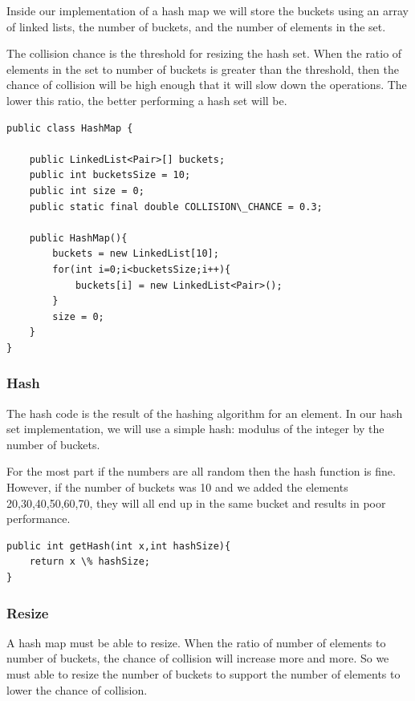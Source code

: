 \documentclass[11pt,oneside]{book}
\begin{document}
Inside our implementation of a hash map we will store the buckets using an array of linked lists, the number of buckets, and the number of elements in the set.

The collision chance is the threshold for resizing the hash set. When the ratio of elements in the set to number of buckets is greater than the threshold, then the chance of collision will be high enough that it will slow down the operations. The lower this ratio, the better performing a hash set will be.

\begin{lstlisting}
public class HashMap {

    public LinkedList<Pair>[] buckets;
    public int bucketsSize = 10;
    public int size = 0;
    public static final double COLLISION\_CHANCE = 0.3;
    
    public HashMap(){
        buckets = new LinkedList[10];
        for(int i=0;i<bucketsSize;i++){
            buckets[i] = new LinkedList<Pair>();
        }
        size = 0;
    }
}
\end{lstlisting}

\subsubsection{Hash}

The hash code is the result of the hashing algorithm for an element. In our hash set implementation, we will use a simple hash: modulus of the integer by the number of buckets.

For the most part if the numbers are all random then the hash function is fine. However, if the number of buckets was 10 and we added the elements 20,30,40,50,60,70, they will all end up in the same bucket and results in poor performance.

\begin{lstlisting}
public int getHash(int x,int hashSize){
    return x \% hashSize;
}
\end{lstlisting}

\subsubsection{Resize}

A hash map must be able to resize. When the ratio of number of elements to number of buckets, the chance of collision will increase more and more. So we must able to resize the number of buckets to support the number of elements to lower the chance of collision.
\end{document}

